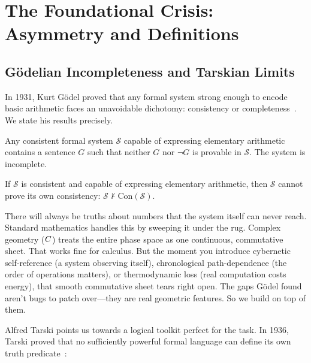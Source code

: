 \newpage



\section{The Foundational Crisis: Asymmetry and Definitions}

\subsection{G\"odelian Incompleteness and Tarskian Limits}

In 1931, Kurt G\"odel proved that any formal system strong enough to encode basic arithmetic faces an unavoidable dichotomy: consistency or completeness~\cite{godel}. We state his results precisely.

\begin{theorem}\label{thm:godel1}
Any consistent formal system $\mathcal{S}$ capable of expressing elementary arithmetic contains a sentence $G$ such that neither $G$ nor $\neg G$ is provable in $\mathcal{S}$. The system is incomplete.
\end{theorem}

\begin{theorem}\label{thm:godel2}
If $\mathcal{S}$ is consistent and capable of expressing elementary arithmetic, then $\mathcal{S}$ cannot prove its own consistency: $\mathcal{S} \nvdash \mathrm{Con}(\mathcal{S})$.
\end{theorem}

There will always be truths about numbers that the system itself can never reach. Standard mathematics handles this by sweeping it under the rug. Complex geometry ($C$) treats the entire phase space as one continuous, commutative sheet. That works fine for calculus. But the moment you introduce cybernetic self-reference (a system observing itself), chronological path-dependence (the order of operations matters), or thermodynamic loss (real computation costs energy), that smooth commutative sheet tears right open. The gaps G\"odel found aren't bugs to patch over---they are real geometric features. So we build on top of them.

Alfred Tarski points us towards a logical toolkit perfect for the task. In 1936, Tarski proved that no sufficiently powerful formal language can define its own truth predicate~\cite{tarski}:

